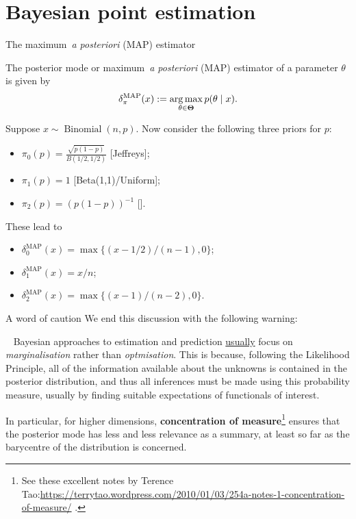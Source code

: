 \section*{Bayesian point estimation}
\begin{frame}{The maximum~\textit{a posteriori} (MAP) estimator}
\begin{defn}
The posterior mode or maximum~\textit{a posteriori} (MAP) estimator of a parameter $\theta$ is given by
\begin{equation}
 \label{eq:MAP}
 \delta_{\pi}^{\text{MAP}}(x) := \operatorname*{arg\,max}_{\theta \in \boldsymbol{\Theta}} p(\theta \mid x).
\end{equation}
\end{defn}
\begin{example}
 Suppose $x \sim \operatorname{Binomial}(n, p)$.
 Now consider the following three priors for $p$: 
 \begin{itemize}
  \item $\pi_0(p) = \frac{\sqrt{p(1-p)}}{B(1/2, 1/2)} $ [Jeffreys];
  \item $\pi_1(p) = 1$ [Beta(1,1)/Uniform];
  \item $\pi_2(p) = \left(p(1-p)\right)^{-1}$ [\cite{Haldane1932}].  
 \end{itemize}
These lead to 
\begin{itemize}
 \item $\delta_0^{\text{MAP}}(x) = \max \{(x-1/2)/(n-1), 0 \}$;
 \item $\delta_1^{\text{MAP}}(x) = x/n$;
 \item $\delta_2^{\text{MAP}}(x) = \max \{ (x-1)/(n-2), 0 \}$.
\end{itemize}
\end{example}
\end{frame}
\begin{frame}{A word of caution}
 We end this discussion with the following warning:
\begin{idea}
\label{idea:always_marginalise}~
 Bayesian approaches to estimation and prediction \underline{usually} focus on \textit{marginalisation} rather than \textit{optmisation}.
 This is because, following the Likelihood Principle, all of the information available about the unknowns is contained in the posterior distribution, and thus all inferences must be made using this probability measure, usually by finding suitable expectations of functionals of interest.
\end{idea}
In particular, for higher dimensions, \textbf{concentration of measure}\footnote{See these excellent notes by Terence Tao:\url{https://terrytao.wordpress.com/2010/01/03/254a-notes-1-concentration-of-measure/} .} ensures that the posterior mode has less and less relevance as a summary, at least so far as the barycentre of the distribution is concerned.
\end{frame}
